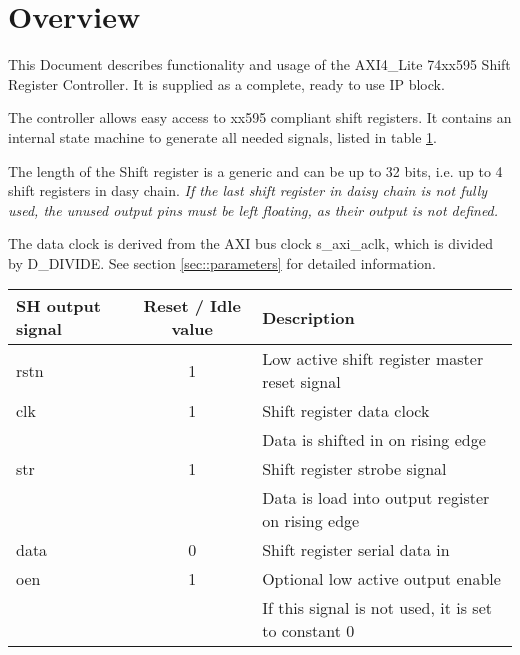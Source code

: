 


\maketitle

\section{Overview}
This Document describes functionality and usage of the AXI4\_Lite 74xx595 Shift Register Controller.
It is supplied as a complete, ready to use IP block.

The controller allows easy access to xx595 compliant shift registers.
It contains an internal state machine to generate all needed signals, listed in table \ref{tbl::signals}.

The length of the Shift register is a generic and can be up to 32 bits, i.e. up to 4 shift registers in dasy chain.
\emph{If the last shift register in daisy chain is not fully used, the unused output pins must be left floating, as their output is not defined.}

The data clock is derived from the AXI bus clock s\_axi\_aclk, which is divided by D\_DIVIDE.
See section \ref{sec::parameters} for detailed information.

\begin{table}[htbp]
	
	\label{tbl::signals}
	\begin{tabular}{|l|c|l|}
		\hline 
		SH output signal & Reset / Idle value & Description \\ 
		\hline 
		rstn & 1 & Low active shift register master reset signal \\ 
		\hline 
		clk & 1 & Shift register data clock \\
		& & Data is shifted in on rising edge \\ 
		\hline 
		str & 1 & Shift register strobe signal \\
		 & & Data is load into output register on rising edge\\ 
		\hline 
		data & 0 & Shift register serial data in \\ 
		\hline 
		oen & 1 & Optional low active output enable \\
		& & If this signal is not used, it is set to constant 0 \\ 
		\hline 
	\end{tabular} 

\end{table}

